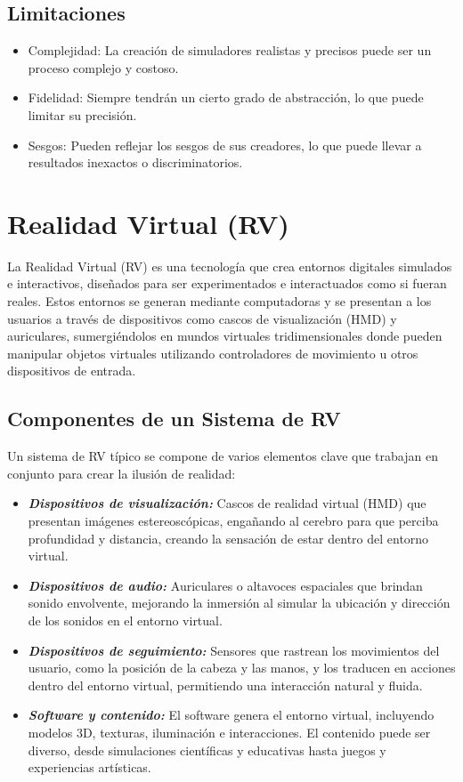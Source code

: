 \subsection{Limitaciones}
\begin{itemize}
    \item Complejidad: 
    La creación de simuladores realistas y precisos puede ser un proceso complejo y costoso.
    \item Fidelidad: 
    Siempre tendrán un cierto grado de abstracción, lo que puede limitar su precisión.
    \item Sesgos: 
    Pueden reflejar los sesgos de sus creadores, lo que puede llevar a resultados inexactos o discriminatorios. 
\end{itemize}

\section{Realidad Virtual (RV)}
La Realidad Virtual (RV) es una tecnología que crea entornos digitales simulados e interactivos, diseñados para ser experimentados e interactuados como si fueran reales. Estos entornos se generan mediante computadoras y se presentan a los usuarios a través de dispositivos como cascos de visualización (HMD) y auriculares, sumergiéndolos en mundos virtuales tridimensionales donde pueden manipular objetos virtuales utilizando controladores de movimiento u otros dispositivos de entrada\cite{VR-Book}.
\subsection{Componentes de un Sistema de RV}
Un sistema de RV típico se compone de varios elementos clave que trabajan en conjunto para crear la ilusión de realidad:
\begin{itemize}
    \item \textit{\textbf{Dispositivos de visualización:}} Cascos de realidad virtual (HMD) que presentan imágenes estereoscópicas, engañando al cerebro para que perciba profundidad y distancia, creando la sensación de estar dentro del entorno virtual.
    \item \textit{\textbf{Dispositivos de audio:}} Auriculares o altavoces espaciales que brindan sonido envolvente, mejorando la inmersión al simular la ubicación y dirección de los sonidos en el entorno virtual.
    \item \textit{\textbf{Dispositivos de seguimiento:}} Sensores que rastrean los movimientos del usuario, como la posición de la cabeza y las manos, y los traducen en acciones dentro del entorno virtual, permitiendo una interacción natural y fluida.
    \item \textit{\textbf{Software y contenido:}} El software genera el entorno virtual, incluyendo modelos 3D, texturas, iluminación e interacciones. El contenido puede ser diverso, desde simulaciones científicas y educativas hasta juegos y experiencias artísticas.
\end{itemize}

